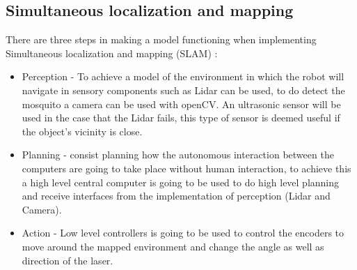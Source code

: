 \documentclass[11pt]{article}
\begin{document}
 \subsection{Simultaneous localization and mapping}
 	There are three steps in making a model functioning when implementing Simultaneous localization and mapping (SLAM) :
 \begin{itemize}
 	\item Perception - To achieve a model of the environment in which the robot will navigate in sensory components such as Lidar can be used, to do detect the mosquito a camera can be used with openCV. An ultrasonic sensor will be used in the case that the Lidar fails, this type of sensor is deemed useful if the object's vicinity is close.
 	\item Planning - consist planning how the autonomous interaction between the computers are going to take place without human interaction, to achieve this a high level central computer is going to be used to do high level planning and receive interfaces from the implementation of perception (Lidar and Camera). 
 	\item Action - Low level controllers is going to be used to control the encoders to move around the mapped environment and change the angle as well as direction of the laser.
 \end{itemize}
\end{document}
